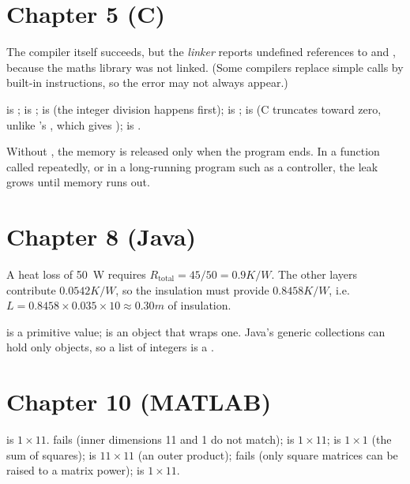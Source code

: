 \section*{Chapter 5 (C)}
\begin{description}[style=nextline,leftmargin=0pt,font=\normalfont]
\item[\AnswerRef{5.1}] The compiler itself succeeds, but the \emph{linker} reports undefined references
  to  and , because the maths library was not linked. (Some compilers
  replace simple calls by built-in instructions, so the error may not always appear.)
\item[\AnswerRef{5.2}]  is ;  is ;  is
   (the integer division happens first);  is ;
   is  (C truncates toward zero, unlike \py's \code{//}, which gives
  );  is .
\item[\AnswerRef{5.5}] Without , the memory is released only when the program ends. In a
  function called repeatedly, or in a long-running program such as a controller, the leak
  grows until memory runs out.
\end{description}

\section*{Chapter 8 (Java)}
\begin{description}[style=nextline,leftmargin=0pt,font=\normalfont]
\item[\AnswerRef{8.2}] A heat loss of 50~W requires $R_\mathrm{total} = 45/50 = 0.9\unit{K/W}$. The
  other layers contribute $0.0542\unit{K/W}$, so the insulation must provide $0.8458\unit{K/W}$,
  i.e.\ $L = 0.8458 \times 0.035 \times 10 \approx 0.30\unit{m}$ of insulation.
\item[\AnswerRef{8.4}]  is a primitive value;  is an object that wraps one.
  Java's generic collections can hold only objects, so a list of integers is a
  .
\end{description}

\section*{Chapter 10 (MATLAB)}
\begin{description}[style=nextline,leftmargin=0pt,font=\normalfont]
\item[\AnswerRef{10.2}]  is $1\times11$.  fails (inner dimensions 11 and 1 do not
  match);  is $1\times11$;  is $1\times1$ (the sum of squares);
   is $11\times11$ (an outer product);  fails (only square matrices
  can be raised to a matrix power);  is $1\times11$.
\end{description}

